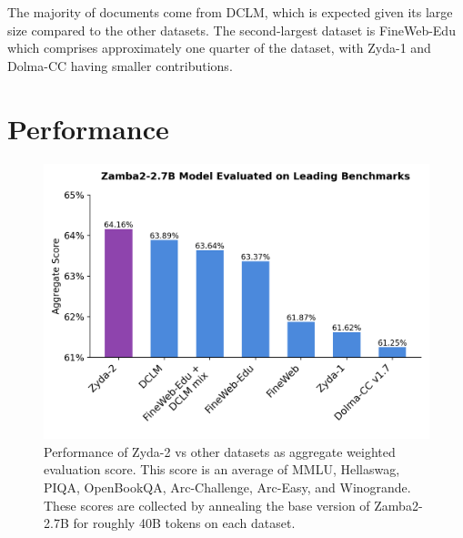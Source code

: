 \documentclass[conference]{IEEEtran}
\begin{document}
The majority of documents come from DCLM, which is expected given its large size compared to the other datasets. The second-largest dataset is FineWeb-Edu which comprises approximately one quarter of the dataset, with Zyda-1 and Dolma-CC having smaller contributions.


\section{Performance}

\begin{figure}[t]
    \centering
    \includegraphics[width=1.1\linewidth]{figures/Zyda-2_perf_barchart.png}
    \caption{Performance of Zyda-2 vs other datasets as aggregate weighted evaluation score. This score is an average of MMLU, Hellaswag, PIQA, OpenBookQA, Arc-Challenge, Arc-Easy, and Winogrande. These scores are collected by annealing the base version of Zamba2-2.7B for roughly 40B tokens on each dataset.}
    \label{fig:Zyda-2-perf}
\end{figure}
\end{document}
